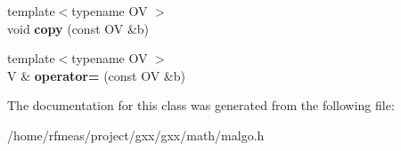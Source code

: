 \begin{DoxyCompactItemize}
\item 
{\footnotesize template$<$typename OV $>$ }\\void {\bfseries copy} (const OV \&b)\hypertarget{classmalgo_1_1vector__basic_a055a33ab3a398a817f618705724bb22e}{}\label{classmalgo_1_1vector__basic_a055a33ab3a398a817f618705724bb22e}

\item 
{\footnotesize template$<$typename OV $>$ }\\V \& {\bfseries operator=} (const OV \&b)\hypertarget{classmalgo_1_1vector__basic_a665c82dacbc5d4ae760e9ff97e66301b}{}\label{classmalgo_1_1vector__basic_a665c82dacbc5d4ae760e9ff97e66301b}

\end{DoxyCompactItemize}


The documentation for this class was generated from the following file\+:\begin{DoxyCompactItemize}
\item 
/home/rfmeas/project/gxx/gxx/math/malgo.\+h\end{DoxyCompactItemize}
